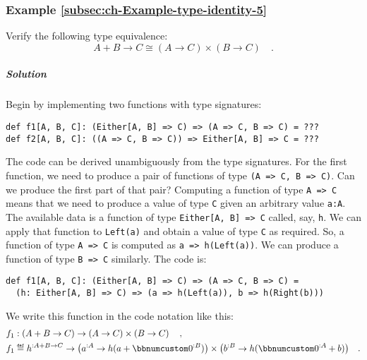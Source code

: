 \subsubsection{Example \label{subsec:ch-Example-type-identity-5}\ref{subsec:ch-Example-type-identity-5}}

Verify the following type equivalence:
\[
A+B\rightarrow C\cong(A\rightarrow C)\times(B\rightarrow C)\quad.
\]


\subparagraph{Solution}

Begin by implementing two functions with type signatures:
\begin{lstlisting}
def f1[A, B, C]: (Either[A, B] => C) => (A => C, B => C) = ???
def f2[A, B, C]: ((A => C, B => C)) => Either[A, B] => C = ???
\end{lstlisting}
The code can be derived unambiguously from the type signatures. For
the first function, we need to produce a pair of functions of type
\lstinline!(A => C, B => C)!. Can we produce the first part of that
pair? Computing a function of type \lstinline!A => C! means that
we need to produce a value of type \lstinline!C! given an arbitrary
value \lstinline!a:A!. The available data is a function of type \lstinline!Either[A, B] => C!
called, say, \lstinline!h!. We can apply that function to \lstinline!Left(a)!
and obtain a value of type \lstinline!C! as required. So, a function
of type \lstinline!A => C! is computed as \lstinline!a => h(Left(a))!.
We can produce a function of type \lstinline!B => C! similarly. The
code is:
\begin{lstlisting}
def f1[A, B, C]: (Either[A, B] => C) => (A => C, B => C) =
  (h: Either[A, B] => C) => (a => h(Left(a)), b => h(Right(b)))
\end{lstlisting}
We write this function in the code notation like this:
\begin{align*}
 & f_{1}:\left(A+B\rightarrow C\right)\rightarrow\left(A\rightarrow C\right)\times\left(B\rightarrow C\right)\quad,\\
 & f_{1}\triangleq h^{:A+B\rightarrow C}\rightarrow\big(a^{:A}\rightarrow h(a+\bbnum 0^{:B})\big)\times\big(b^{:B}\rightarrow h(\bbnum 0^{:A}+b)\big)\quad.
\end{align*}

